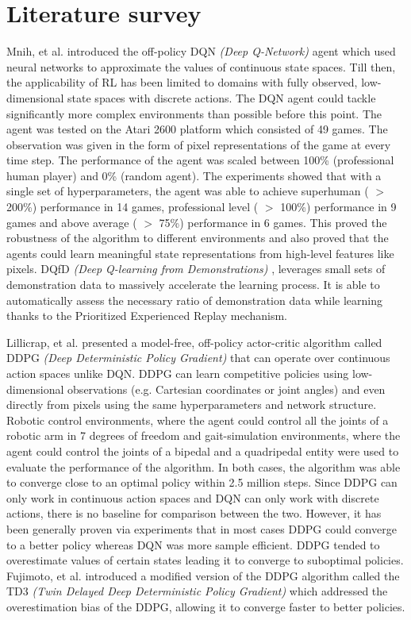 \documentclass[12pt,a4paper]{article}
\begin{document}
\section{Literature survey}
Mnih, et al. \cite{dqn} introduced the off-policy DQN \textit{(Deep Q-Network)} agent which used neural networks to approximate the values of continuous state spaces. Till then, the applicability of RL has been limited to domains with fully observed, low-dimensional state spaces with discrete actions. The DQN agent could tackle significantly more complex environments than possible before this point. The agent was tested on the Atari 2600 platform which consisted of 49 games. The observation was given in the form of pixel representations of the game at every time step. The performance of the agent was scaled between 100\% (professional human player) and 0\% (random agent). The experiments showed that with a single set of hyperparameters, the agent was able to achieve superhuman ( $>$ 200\%) performance in 14 games, professional level ( $>$ 100\%) performance in 9 games and above average ( $>$ 75\%) performance in 6 games. This proved the robustness of the algorithm to different environments and also proved that the agents could learn meaningful state representations from high-level features like pixels. DQfD \textit{(Deep Q-learning from Demonstrations)} \cite{dqdf}, leverages small sets of demonstration data to massively accelerate the learning process. It is able to automatically assess the necessary ratio of demonstration data while learning thanks to the Prioritized Experienced Replay \cite{per} mechanism. 

Lillicrap, et al. \cite{ddpg} presented a model-free, off-policy actor-critic
algorithm called DDPG \textit{(Deep Deterministic Policy Gradient)} that can operate over continuous action spaces unlike DQN. DDPG can learn competitive policies using low-dimensional observations (e.g. Cartesian coordinates or joint angles) and even directly from pixels using the same hyperparameters and network structure. Robotic control environments, where the agent could control all the joints of a robotic arm in 7 degrees of freedom and gait-simulation environments, where the agent could control the joints of a bipedal and a quadripedal entity were used to evaluate the performance of the algorithm. In both cases, the algorithm was able to converge close to an optimal policy within 2.5 million steps. Since DDPG can only work in continuous action spaces and DQN can only work with discrete actions, there is no baseline for comparison between the two. However, it has been generally proven via experiments that in most cases DDPG could converge to a better policy whereas DQN was more sample efficient. DDPG tended to overestimate values of certain states leading it to converge to suboptimal policies. Fujimoto, et al. \cite{td3} introduced
a modified version of the DDPG algorithm called the TD3 \textit{(Twin Delayed Deep Deterministic Policy Gradient)} which addressed the overestimation bias of the DDPG, allowing it to converge faster to better policies.
\linebreak
\end{document}
